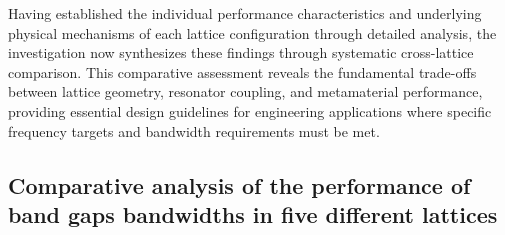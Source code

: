 \documentclass[review,numbers,sort&compress]{elsarticle}
\begin{document}
\begin{table}[htb]
    \centering
    \caption{The lower $f_4$ and upper $f_5$ edge frequencies in modes 4 and 5, along with FBGW 2 in a kagomé lattice.}
    \label{tab_kag_latice_fbgw2}
\end{table}

Having established the individual performance characteristics and underlying physical mechanisms of each lattice configuration through detailed analysis, the investigation now synthesizes these findings through systematic cross-lattice comparison. This comparative assessment reveals the fundamental trade-offs between lattice geometry, resonator coupling, and metamaterial performance, providing essential design guidelines for engineering applications where specific frequency targets and bandwidth requirements must be met.

\subsection{Comparative analysis of the performance of band gaps bandwidths in five different lattices}
\label{comp_performance_lattices}
\end{document}
